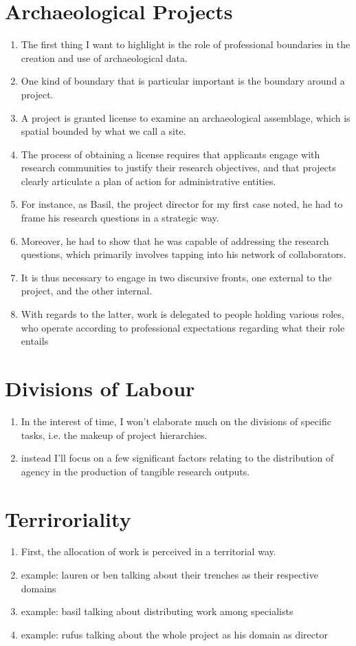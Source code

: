 \documentclass{article}
\begin{document}
\section{Archaeological Projects}
\begin{enumerate}
  \item The first thing I want to highlight is the role of professional boundaries in the creation and use of archaeological data.
  \item One kind of boundary that is particular important is the boundary around a project.
  \item A project is granted license to examine an archaeological assemblage, which is spatial bounded by what we call a site.
  \item The process of obtaining a license requires that applicants engage with research communities to justify their research objectives, and that projects clearly articulate a plan of action for administrative entities.
  \item For instance, as Basil, the project director for my first case noted, he had to frame his research questions in a strategic way.
  \item Moreover, he had to show that he was capable of addressing the research questions, which primarily involves tapping into his network of collaborators.
  \item It is thus necessary to engage in two discursive fronts, one external to the project, and the other internal.
  \item With regards to the latter, work is delegated to people holding various roles, who operate according to professional expectations regarding what their role entails

\end{enumerate}

\section{Divisions of Labour}
\begin{enumerate}
  \item In the interest of time, I won't elaborate much on the divisions of specific tasks, i.e. the makeup of project hierarchies.
  \item instead I'll focus on a few significant factors relating to the distribution of agency in the production of tangible research outputs.
\end{enumerate}
  
\section{Terriroriality}
\begin{enumerate}
  \item First, the allocation of work is perceived in a territorial way.
  \item example: lauren or ben talking about their trenches as their respective domains
  \item example: basil talking about distributing work among specialists
  \item example: rufus talking about the whole project as his domain as director
\end{enumerate}
\end{document}
